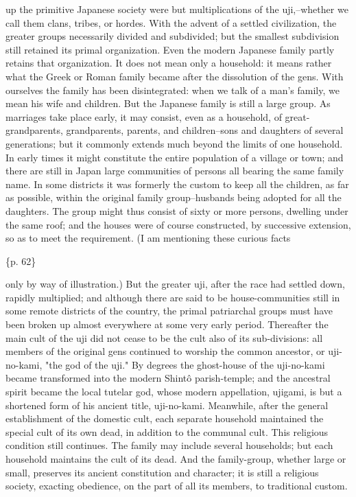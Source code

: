 up the primitive Japanese society were but multiplications of the uji,--whether we call them clans, tribes, or hordes. With the advent of a settled civilization, the greater groups necessarily divided and subdivided; but the smallest subdivision still retained its primal organization. Even the modern Japanese family partly retains that organization. It does not mean only a household: it means rather what the Greek or Roman family became after the dissolution of the gens. With ourselves the family has been disintegrated: when we talk of a man's family, we mean his wife and children. But the Japanese family is still a large group. As marriages take place early, it may consist, even as a household, of great-grandparents, grandparents, parents, and children--sons and daughters of several generations; but it commonly extends much beyond the limits of one household. In early times it might constitute the entire population of a village or town; and there are still in Japan large communities of persons all bearing the same family name. In some districts it was formerly the custom to keep all the children, as far as possible, within the original family group--husbands being adopted for all the daughters. The group might thus consist of sixty or more persons, dwelling under the same roof; and the houses were of course constructed, by successive extension, so as to meet the requirement. (I am mentioning these curious facts

\{p. 62\}

only by way of illustration.) But the greater uji, after the race had settled down, rapidly multiplied; and although there are said to be house-communities still in some remote districts of the country, the primal patriarchal groups must have been broken up almost everywhere at some very early period. Thereafter the main cult of the uji did not cease to be the cult also of its sub-divisions: all members of the original gens continued to worship the common ancestor, or uji-no-kami, "the god of the uji." By degrees the ghost-house of the uji-no-kami became transformed into the modern Shintô parish-temple; and the ancestral spirit became the local tutelar god, whose modern appellation, ujigami, is but a shortened form of his ancient title, uji-no-kami. Meanwhile, after the general establishment of the domestic cult, each separate household maintained the special cult of its own dead, in addition to the communal cult. This religious condition still continues. The family may include several households; but each household maintains the cult of its dead. And the family-group, whether large or small, preserves its ancient constitution and character; it is still a religious society, exacting obedience, on the part of all its members, to traditional custom.



